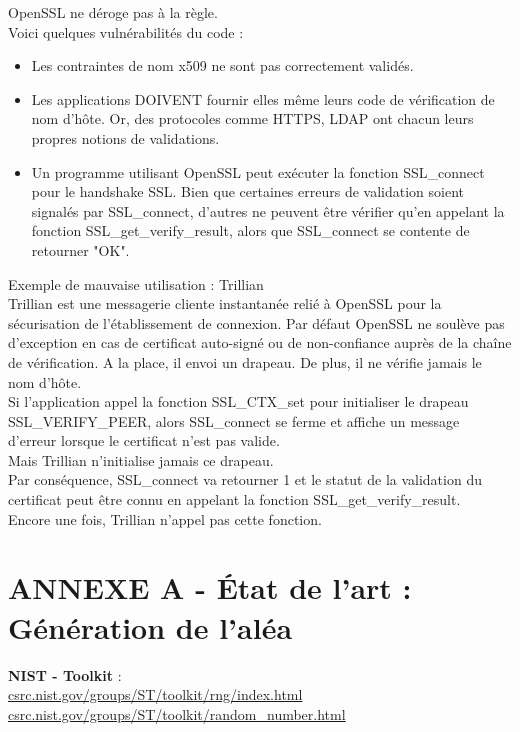 \documentclass{article}
\begin{document}
	OpenSSL ne déroge pas à la règle.\\
	Voici quelques vulnérabilités du code :
	\begin{itemize}
	\item Les contraintes de nom x509 ne sont pas correctement validés.
	\item Les applications DOIVENT fournir elles même leurs code de
	vérification de nom d'hôte. Or, des protocoles comme HTTPS, LDAP
	ont chacun leurs propres notions de validations.
	\item Un programme utilisant OpenSSL peut exécuter la fonction
	SSL\_connect pour le handshake SSL. Bien que certaines erreurs de
	validation soient signalés par SSL\_connect, d'autres ne peuvent
	être vérifier qu'en appelant la fonction SSL\_get\_verify\_result,
	alors que SSL\_connect se contente de retourner "OK".
	\end{itemize}
	
	Exemple de mauvaise utilisation : Trillian\\
	Trillian est une messagerie cliente instantanée	relié à OpenSSL
	pour la sécurisation de l'établissement de connexion.
	Par défaut OpenSSL ne soulève pas d'exception en cas de certificat
	auto-signé ou de non-confiance auprès de la chaîne de vérification.
	A la place, il envoi un drapeau. De plus, il ne vérifie jamais le
	nom d'hôte.\\
	
	Si l'application appel la fonction SSL_CTX_set pour initialiser
	le drapeau SSL_VERIFY_PEER, alors SSL_connect se ferme et affiche un
	message d'erreur lorsque le certificat n'est pas valide.\\
	Mais Trillian n'initialise jamais ce drapeau.\\
	Par conséquence, SSL_connect va retourner 1 et le statut de la
	validation du certificat peut être connu en appelant la fonction
	SSL_get_verify_result.\\
	Encore une fois, Trillian n'appel pas cette fonction.\\
	
\section{ANNEXE A - État de l'art : Génération de l'aléa}
	
	\textbf{NIST - Toolkit} : \\
	\href{http://csrc.nist.gov/groups/ST/toolkit/rng/index.html}
	{csrc.nist.gov/groups/ST/toolkit/rng/index.html}\\
	\href{http://csrc.nist.gov/groups/ST/toolkit/random\_number.html}
	{csrc.nist.gov/groups/ST/toolkit/random\_number.html}\\
\end{document}
